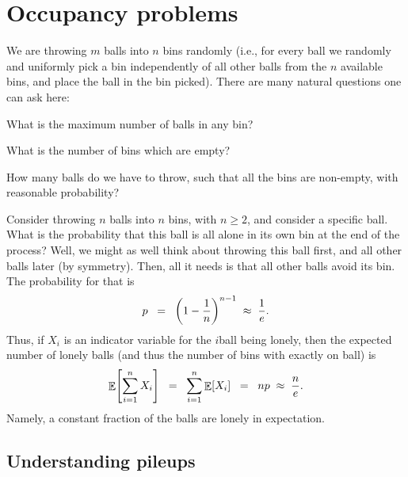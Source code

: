 \section{Occupancy problems}

\begin{problem}
    We are throwing $m$ balls into $n$ bins randomly (i.e., for every
    ball we randomly and uniformly pick a bin independently of all other
    balls from the $n$ available bins, and place the ball in the bin
    picked).  There are many natural questions one can ask here:
    \begin{compactenumA}
        \smallskip%
        \item {} What is the maximum number of balls in any bin?
        \smallskip%
        \item What is the number of bins which are empty?
        \smallskip%
        \item How many balls do we have to throw, such that all the
        bins are non-empty, with reasonable probability?
    \end{compactenumA}
\end{problem}

\begin{example}
    Consider throwing $n$ balls into $n$ bins, with $n\geq2$, and
    consider a specific ball. What is the probability that this ball is
    all alone in its own bin at the end of the process? Well, we might as
    well think about throwing this ball first, and all other balls later
    (by symmetry). Then, all it needs is that all other balls avoid its
    bin. The probability for that is
    \begin{equation*}
        p \EQ \pth{1- \frac{1}{n}}^{n-1} \;\approx\; \frac{1}{e}.
    \end{equation*}
    Thus, if $X_i$ is an indicator variable for the $i$\th ball being
    lonely, then the expected number of lonely balls (and thus the number
    of bins with exactly on ball) is
    \begin{equation*}
        \Ex{\sum_{i=1}^n X_i}
        \EQ%
        \sum_{i=1}^n \Ex{X_i}
        \EQ
        np
        \;\approx\;
        \frac{n}{e}.
    \end{equation*}
    Namely, a constant fraction of the balls are lonely in expectation.
\end{example}

\subsection{Understanding pileups}

